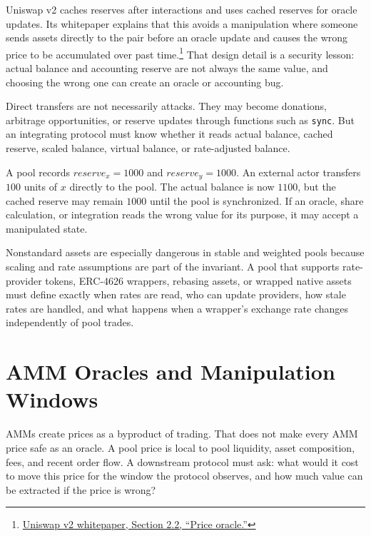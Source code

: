 Uniswap v2 caches reserves after interactions and uses cached reserves for oracle updates. Its whitepaper explains that this avoids a manipulation where someone sends assets directly to the pair before an oracle update and causes the wrong price to be accumulated over past time.\footnote{\href{https://app.uniswap.org/whitepaper.pdf}{Uniswap v2 whitepaper, Section 2.2, ``Price oracle.''}} That design detail is a security lesson: actual balance and accounting reserve are not always the same value, and choosing the wrong one can create an oracle or accounting bug.

Direct transfers are not necessarily attacks. They may become donations, arbitrage opportunities, or reserve updates through functions such as \texttt{sync}. But an integrating protocol must know whether it reads actual balance, cached reserve, scaled balance, virtual balance, or rate-adjusted balance.

\begin{failuremodebox}
A pool records \(reserve_x = 1000\) and \(reserve_y = 1000\). An external actor transfers \(100\) units of \(x\) directly to the pool. The actual balance is now \(1100\), but the cached reserve may remain \(1000\) until the pool is synchronized. If an oracle, share calculation, or integration reads the wrong value for its purpose, it may accept a manipulated state.
\end{failuremodebox}

Nonstandard assets are especially dangerous in stable and weighted pools because scaling and rate assumptions are part of the invariant. A pool that supports rate-provider tokens, ERC-4626 wrappers, rebasing assets, or wrapped native assets must define exactly when rates are read, who can update providers, how stale rates are handled, and what happens when a wrapper's exchange rate changes independently of pool trades.

\section{AMM Oracles and Manipulation Windows}

AMMs create prices as a byproduct of trading. That does not make every AMM price safe as an oracle. A pool price is local to pool liquidity, asset composition, fees, and recent order flow. A downstream protocol must ask: what would it cost to move this price for the window the protocol observes, and how much value can be extracted if the price is wrong?

